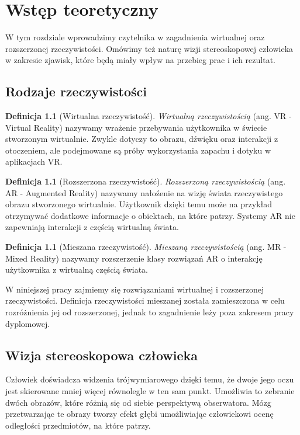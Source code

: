 \documentclass[a4paper,11pt,twoside]{report}
\theoremstyle{definition}
\newtheorem{definition}[theorem]{Definicja}
\begin{document}
\chapter{Wstęp teoretyczny}

W tym rozdziale wprowadzimy czytelnika w zagadnienia wirtualnej oraz rozszerzonej rzeczywistości. Omówimy też naturę wizji stereoskopowej człowieka w zakresie zjawisk, które będą miały wpływ na przebieg prac i ich rezultat.

\section {Rodzaje rzeczywistości}

\begin{definition}[Wirtualna rzeczywistość]
\textit{Wirtualną rzeczywistością} (ang. VR - Virtual Reality) nazywamy wrażenie przebywania użytkownika w świecie stworzonym wirtualnie. Zwykle dotyczy to obrazu, dźwięku oraz interakcji z otoczeniem, ale podejmowane są próby wykorzystania zapachu i dotyku w aplikacjach VR.
\end{definition}

\begin{definition}[Rozszerzona rzeczywistość]
\textit{Rozszerzoną rzeczywistością} (ang. AR - Augmented Reality) nazywamy nałoźenie na wizję świata rzeczywistego obrazu stworzonego wirtualnie. Użytkownik dzięki temu może na przykład otrzymywać dodatkowe informacje o obiektach, na które patrzy. Systemy AR nie zapewniają interakcji z częścią wirtualną świata.
\end{definition}

\begin{definition}[Mieszana rzeczywistość]
\textit{Mieszaną rzeczywistością} (ang. MR - Mixed Reality) nazywamy rozszerzenie klasy rozwiązań AR o interakcję użytkownika z wirtualną częścią świata.
\end{definition}

W niniejszej pracy zajmiemy się rozwiązaniami wirtualnej i rozszerzonej rzeczywistości. Definicja rzeczywistości mieszanej została zamieszczona w celu rozróżnienia jej od rozszerzonej, jednak to zagadnienie leży poza zakresem pracy dyplomowej.

\section {Wizja stereoskopowa człowieka}

Człowiek doświadcza widzenia trójwymiarowego dzięki temu, że dwoje jego oczu jest skierowane mniej więcej równolegle w ten sam punkt. Umożliwia to zebranie dwóch obrazów, które różnią się od siebie perspektywą obserwatora. Mózg przetwarzając te obrazy tworzy efekt głębi umożliwiając człowiekowi ocenę odległości przedmiotów, na które patrzy.
\end{document}

